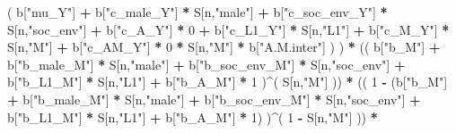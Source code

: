 \documentclass[
]{book}
\newenvironment{Shaded}{\begin{snugshade}}{\end{snugshade}}
\newcommand{\DecValTok}[1]{\textcolor[rgb]{0.00,0.00,0.81}{#1}}
\newcommand{\NormalTok}[1]{#1}
\newcommand{\SpecialCharTok}[1]{\textcolor[rgb]{0.81,0.36,0.00}{\textbf{#1}}}
\newcommand{\StringTok}[1]{\textcolor[rgb]{0.31,0.60,0.02}{#1}}
\begin{document}
\begin{Shaded}
\begin{Highlighting}[]
\NormalTok{                           ( b[}\StringTok{"mu\_Y"}\NormalTok{] }\SpecialCharTok{+} 
\NormalTok{                               b[}\StringTok{"c\_male\_Y"}\NormalTok{] }\SpecialCharTok{*}\NormalTok{ S[n,}\StringTok{"male"}\NormalTok{] }\SpecialCharTok{+} 
\NormalTok{                               b[}\StringTok{"c\_soc\_env\_Y"}\NormalTok{] }\SpecialCharTok{*}\NormalTok{ S[n,}\StringTok{"soc\_env"}\NormalTok{] }\SpecialCharTok{+} 
\NormalTok{                               b[}\StringTok{"c\_A\_Y"}\NormalTok{] }\SpecialCharTok{*} \DecValTok{0} \SpecialCharTok{+} 
\NormalTok{                               b[}\StringTok{"c\_L1\_Y"}\NormalTok{] }\SpecialCharTok{*}\NormalTok{ S[n,}\StringTok{"L1"}\NormalTok{] }\SpecialCharTok{+}
\NormalTok{                               b[}\StringTok{"c\_M\_Y"}\NormalTok{] }\SpecialCharTok{*}\NormalTok{ S[n,}\StringTok{"M"}\NormalTok{] }\SpecialCharTok{+} 
\NormalTok{                               b[}\StringTok{"c\_AM\_Y"}\NormalTok{] }\SpecialCharTok{*} \DecValTok{0} \SpecialCharTok{*}\NormalTok{ S[n,}\StringTok{"M"}\NormalTok{] }\SpecialCharTok{*}\NormalTok{ b[}\StringTok{"A.M.inter"}\NormalTok{] ) ) }\SpecialCharTok{*}
\NormalTok{      (( b[}\StringTok{"b\_M"}\NormalTok{] }\SpecialCharTok{+} 
\NormalTok{           b[}\StringTok{"b\_male\_M"}\NormalTok{] }\SpecialCharTok{*}\NormalTok{ S[n,}\StringTok{"male"}\NormalTok{] }\SpecialCharTok{+} 
\NormalTok{           b[}\StringTok{"b\_soc\_env\_M"}\NormalTok{] }\SpecialCharTok{*}\NormalTok{ S[n,}\StringTok{"soc\_env"}\NormalTok{] }\SpecialCharTok{+}
\NormalTok{           b[}\StringTok{"b\_L1\_M"}\NormalTok{] }\SpecialCharTok{*}\NormalTok{ S[n,}\StringTok{"L1"}\NormalTok{] }\SpecialCharTok{+}
\NormalTok{           b[}\StringTok{"b\_A\_M"}\NormalTok{] }\SpecialCharTok{*} \DecValTok{1}\NormalTok{ )}\SpecialCharTok{\^{}}\NormalTok{( S[n,}\StringTok{"M"}\NormalTok{] )) }\SpecialCharTok{*} 
\NormalTok{      (( }\DecValTok{1} \SpecialCharTok{{-}}\NormalTok{ (b[}\StringTok{"b\_M"}\NormalTok{] }\SpecialCharTok{+} 
\NormalTok{                b[}\StringTok{"b\_male\_M"}\NormalTok{] }\SpecialCharTok{*}\NormalTok{ S[n,}\StringTok{"male"}\NormalTok{] }\SpecialCharTok{+} 
\NormalTok{                b[}\StringTok{"b\_soc\_env\_M"}\NormalTok{] }\SpecialCharTok{*}\NormalTok{ S[n,}\StringTok{"soc\_env"}\NormalTok{] }\SpecialCharTok{+} 
\NormalTok{                b[}\StringTok{"b\_L1\_M"}\NormalTok{] }\SpecialCharTok{*}\NormalTok{ S[n,}\StringTok{"L1"}\NormalTok{] }\SpecialCharTok{+}
\NormalTok{                b[}\StringTok{"b\_A\_M"}\NormalTok{] }\SpecialCharTok{*} \DecValTok{1}\NormalTok{) )}\SpecialCharTok{\^{}}\NormalTok{( }\DecValTok{1} \SpecialCharTok{{-}}\NormalTok{ S[n,}\StringTok{"M"}\NormalTok{] ))  }\SpecialCharTok{*}

\end{Highlighting}
\end{Shaded}
\end{document}
